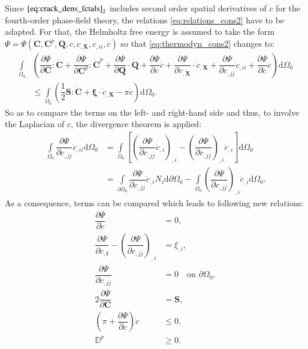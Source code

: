 Since $\eqref{eq:crack_dens_fctals}_{2}$ includes second order spatial derivatives of $c$ for the fourth-order phase-field theory, the relations \eqref{eq:relations_cons2} have to be adapted. For that, the Helmholtz free energy is assumed to take the form $\Psi=\Psi\left(\mathbf{C},\mathbf{C}^{p},\mathbf{Q},c,c_{,\mathbf{X}},c_{,ii},\dot{c}\right)$ so that \eqref{eq:thermodyn_cons2} changes to:
\begin{equation} \label{eq:thermodyn_cons4}
	\begin{aligned}
	\int\limits_{\Omega_{0}}&\left(\dfrac{\partial\Psi}{\partial\mathbf{C}}:\dot{\mathbf{C}}+\dfrac{\partial\Psi}{\partial\mathbf{C}^{p}}:\dot{\mathbf{C}}^{p}+\dfrac{\partial\Psi}{\partial\mathbf{Q}}\cdot\dot{\mathbf{Q}}+\dfrac{\partial\Psi}{\partial c}\dot{c}+\dfrac{\partial\Psi}{\partial c_{,\mathbf{X}}}\cdot\dot{c}_{,\mathbf{X}}+\dfrac{\partial\Psi}{\partial c_{,jj}}\dot{c}_{,ii}+\dfrac{\partial\Psi}{\partial\dot{c}}\ddot{c}\right)\mathrm{d}\Omega_{0} \\
	&\leq \int\limits_{\Omega_{0}}\left(\dfrac{1}{2}\mathbf{S}:\dot{\mathbf{C}}+\bm{\xi}\cdot\dot{c}_{,\mathbf{X}}-\pi\dot{c}\right)\mathrm{d}\Omega_{0}.
	\end{aligned}
\end{equation}
So as to compare the terms on the left- and right-hand side and thus, to involve the Laplacian of $c$, the divergence theorem is applied:
\begin{equation} \label{eq:div_theorem_Lapl_c}
	\begin{aligned}
		\int\limits_{\Omega_{0}}\dfrac{\partial\Psi}{\partial c_{,jj}}\dot{c}_{,ii}\mathrm{d}\Omega_{0} &= \int\limits_{\Omega_{0}}\left[\left(\dfrac{\partial\Psi}{\partial c_{,jj}}\dot{c}_{,i}\right)_{,i}-\left(\dfrac{\partial\Psi}{\partial c_{,jj}}\right)_{,i}\dot{c}_{,i}\right]\mathrm{d}\Omega_{0} \\
		&= \int\limits_{\partial\Omega_{0}}\dfrac{\partial\Psi}{\partial c_{,jj}}\dot{c}_{,i}N_{i}\mathrm{d}\partial\Omega_{0}-\int\limits_{\Omega_{0}}\left(\dfrac{\partial\Psi}{\partial c_{,jj}}\right)_{,i}\dot{c}_{,i}\mathrm{d}\Omega_{0}.
	\end{aligned}
\end{equation}
As a consequence, terms can be compared which leads to following new relations:
\begin{equation} \label{eq:relations_cons4}
	\begin{aligned}
		\dfrac{\partial\Psi}{\partial\dot{c}} &= 0, \\
		\dfrac{\partial\Psi}{\partial c_{,\mathbf{i}}} -\left(\dfrac{\partial\Psi}{\partial c_{,jj}}\right)_{,i} &= \xi_{,i}, \\
		\dfrac{\partial\Psi}{\partial c_{,jj}} &= 0 \quad \text{on } \partial\Omega_{0}, \\
		2\dfrac{\partial\Psi}{\partial\mathbf{C}} &= \mathbf{S}, \\
		\left(\pi+\dfrac{\partial\Psi}{\partial c}\right)\dot{c} &\leq 0, \\
		\mathbb{D}^{p} &\geq 0.
	\end{aligned}
\end{equation}
